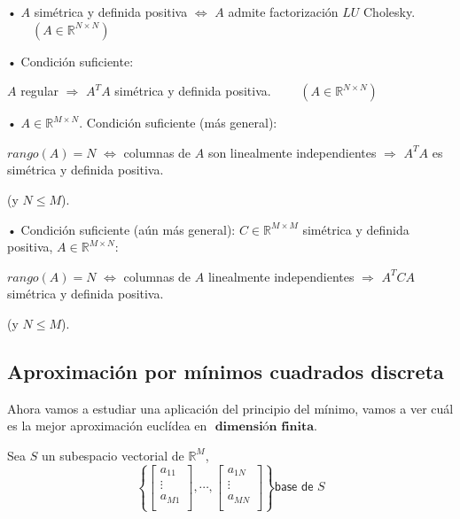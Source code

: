 \begin{nprop}
	\begin{nlist}
	\item[•] $A$ simétrica y definida positiva $\Leftrightarrow$ $A$ admite factorización $LU$ Cholesky. $\qquad (A \in \mathbb{R}^{N \times N})$
	
	\item[•] Condición suficiente:
	
	$A$ regular $\Rightarrow$ $A^TA$ simétrica y definida positiva. $\qquad (A \in \mathbb{R}^{N \times N})$
	
	\item[•] $A \in \mathbb{R}^{M \times N}$. Condición suficiente (más general):
	
	$rango(A) = N$ $\Leftrightarrow$ columnas de $A$ son linealmente independientes $\Rightarrow$ $A^TA$ es simétrica y definida positiva.
	
	(y $N \leq M$).
	
	\item[•] Condición suficiente (aún más general): $C \in \mathbb{R}^{M \times M}$ simétrica y definida positiva, $A \in \mathbb{R}^{M \times N}$:
	
	$rango (A) = N$ $\Leftrightarrow$ columnas de $A$ linealmente independientes $\Rightarrow$ $A^TCA$ simétrica y definida positiva.
	
	(y $N \leq M$).
	
	\end{nlist}
\end{nprop}

\subsection{Aproximación por mínimos cuadrados discreta}
Ahora vamos a estudiar una aplicación del principio del mínimo, vamos a ver cuál es la mejor aproximación euclídea en $\textbf{ dimensión finita.}$

Sea $S$ un subespacio vectorial de $\mathbb{R}^M$,
$$
\left\lbrace
\begin{bmatrix}
a_{11} \\
\vdots \\
a_{M1} \\
\end{bmatrix}
, \cdots,
\begin{bmatrix}
a_{1N} \\
\vdots \\
a_{MN} \\
\end{bmatrix}
\right\rbrace
\textsf{base de } S
$$

